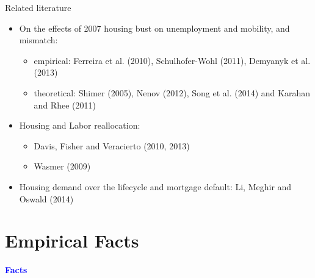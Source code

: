 \documentclass[12pt,english, aspectratio=169]{beamer}
\begin{document}
\begin{longv}
\begin{frame}{Related literature }

\begin{itemize}
\item On the effects of 2007 housing bust on unemployment and mobility,
and mismatch: 

\begin{itemize}
\item {\footnotesize{}empirical: Ferreira et al. (2010), Schulhofer-Wohl
(2011), Demyanyk et al. (2013)}{\footnotesize\par}
\item {\footnotesize{}theoretical: Shimer (2005), Nenov (2012), Song et
al. (2014) and Karahan and Rhee (2011)\vspace{3mm}}{\footnotesize\par}
\end{itemize}
\item Housing and Labor reallocation: 

\begin{itemize}
\item {\footnotesize{}Davis, Fisher and Veracierto (2010, 2013)}{\footnotesize\par}
\item {\footnotesize{}Wasmer (2009)\vspace{3mm}}{\footnotesize\par}
\end{itemize}
\item Housing demand over the lifecycle and mortgage default:{\footnotesize{}
Li, Meghir and Oswald (2014)\vspace{3mm}}{\footnotesize\par}

{\footnotesize{}}{\footnotesize\par}
\end{itemize}
\end{frame}
\end{longv}
\section{Empirical Facts}

\begin{frame}[plain]{}

\vspace{1cm}

\begin{center}
\textbf{\textcolor{blue}{\LARGE{}Facts}}{\LARGE\par}
\par\end{center}

\end{frame}
\end{document}
